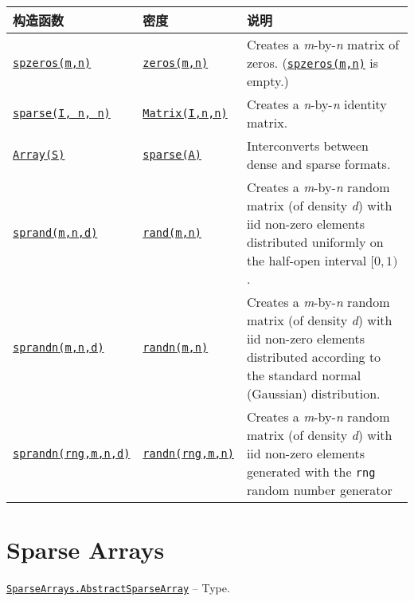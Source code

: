 \begin{table}[h]

\begin{tabulary}{\linewidth}{|L|L|L|}
\hline
构造函数 & 密度 & 说明 \\
\hline
\hyperlink{10306793690101482847}{\texttt{spzeros(m,n)}} & \hyperlink{13837674686090348619}{\texttt{zeros(m,n)}} & Creates a \emph{m}-by-\emph{n} matrix of zeros. (\hyperlink{10306793690101482847}{\texttt{spzeros(m,n)}} is empty.) \\
\hline
\hyperlink{10167157011990389788}{\texttt{sparse(I, n, n)}} & \hyperlink{5448927444601277512}{\texttt{Matrix(I,n,n)}} & Creates a \emph{n}-by-\emph{n} identity matrix. \\
\hline
\hyperlink{15492651498431872487}{\texttt{Array(S)}} & \hyperlink{10167157011990389788}{\texttt{sparse(A)}} & Interconverts between dense and sparse formats. \\
\hline
\hyperlink{10437881912081266792}{\texttt{sprand(m,n,d)}} & \hyperlink{7668863842145012694}{\texttt{rand(m,n)}} & Creates a \emph{m}-by-\emph{n} random matrix (of density \emph{d}) with iid non-zero elements distributed uniformly on the half-open interval  \([0, 1)\) . \\
\hline
\hyperlink{3588082437273281277}{\texttt{sprandn(m,n,d)}} & \hyperlink{7347069443766288058}{\texttt{randn(m,n)}} & Creates a \emph{m}-by-\emph{n} random matrix (of density \emph{d}) with iid non-zero elements distributed according to the standard normal (Gaussian) distribution. \\
\hline
\hyperlink{3588082437273281277}{\texttt{sprandn(rng,m,n,d)}} & \hyperlink{7347069443766288058}{\texttt{randn(rng,m,n)}} & Creates a \emph{m}-by-\emph{n} random matrix (of density \emph{d}) with iid non-zero elements generated with the \texttt{rng} random number generator \\
\hline
\end{tabulary}

\end{table}



\hypertarget{2402954669804328212}{}


\chapter{Sparse Arrays}


\hypertarget{428748181300158251}{} 
\hyperlink{428748181300158251}{\texttt{SparseArrays.AbstractSparseArray}}  -- {Type.}

